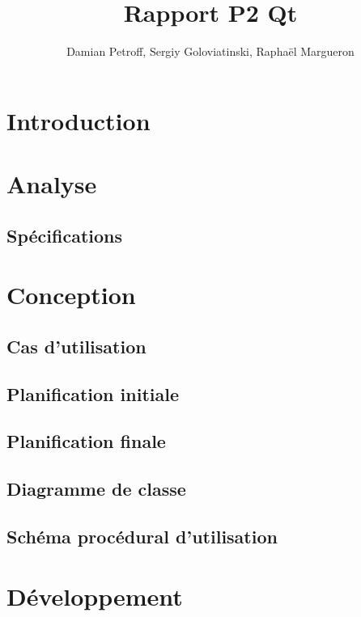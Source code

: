 \documentclass[a4paper,10pt,openany,oneside]{book}
\begin{document}
\title{Rapport P2 Qt}
\author{Damian Petroff, Sergiy Goloviatinski, Raphaël Margueron}
\maketitle

\tableofcontents
\thispagestyle{empty}


\chapter{Introduction}
\setcounter{page}{1}
\thispagestyle{headings}

\chapter{Analyse}
\thispagestyle{headings}

\section{Spécifications}

\chapter{Conception}
\thispagestyle{headings}

\section{Cas d'utilisation}

\section{Planification initiale}

\section{Planification finale}

\section{Diagramme de classe}

\section{Schéma procédural d'utilisation}

\chapter{Développement}
\thispagestyle{headings}
\end{document}
